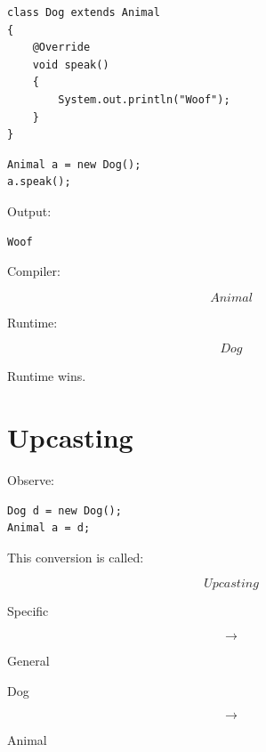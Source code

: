 \documentclass[11pt,a4paper]{book}
\begin{document}
\begin{verbatim}
class Dog extends Animal
{
    @Override
    void speak()
    {
        System.out.println("Woof");
    }
}
\end{verbatim}


\begin{verbatim}
Animal a = new Dog();
a.speak();
\end{verbatim}


Output:

\begin{verbatim}
Woof
\end{verbatim}


Compiler:

\[
Animal
\]

Runtime:

\[
Dog
\]

Runtime wins.


\section{Upcasting}

Observe:

\begin{verbatim}
Dog d = new Dog();
Animal a = d;
\end{verbatim}


This conversion is called:

\[
Upcasting
\]


Specific

\[
\rightarrow
\]

General


Dog

\[
\rightarrow
\]

Animal

\end{document}
